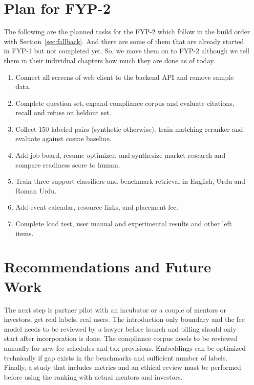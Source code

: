 \documentclass{FastFyp}
\begin{document}
\section{Plan for FYP-2}
The following are the planned tasks for the FYP-2 which follow in the build order with Section~\ref{sec:fallback}. And there are some of them that are already started in FYP-1 but not completed yet. So, we move them on to FYP-2 although we tell them in their individual chapters how much they are done as of today.
\begin{enumerate}
\item Connect all screens of web client to the backend API and remove sample data.
\item Complete question set, expand compliance corpus and evaluate citations, recall and refuse on heldout set.
\item Collect 150 labeled pairs (synthetic otherwise), train matching reranker and evaluate against cosine baseline.
\item Add job board, resume optimizer, and synthesize market research and compare readiness score to human.
\item Train three support classifiers and benchmark retrieval in English, Urdu and Roman Urdu.
\item Add event calendar, resource links, and placement fee.
\item Complete load test, user manual and experimental results and other left items.
\end{enumerate}

\section{Recommendations and Future Work}
The next step is partner pilot with an incubator or a couple of mentors or investors, get real labels, real users. The introduction only boundary and the fee model needs to be reviewed by a lawyer before launch and billing should only start after incorporation is done. The compliance corpus needs to be reviewed annually for new fee schedules and tax provisions. Embeddings can be optimized technically if gap exists in the benchmarks and sufficient number of labels. Finally, a study that includes metrics and an ethical review must be performed before using the ranking with actual mentors and investors.
\end{document}
